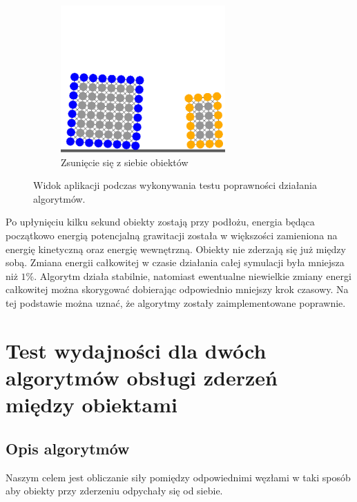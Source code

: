 \documentclass[12pt, letterpaper]{report}
\begin{document}
\begin{figure}[H]
\begin{subfigure}{0.5\textwidth}
            \includegraphics[width=6.3cm]{app_correctness_04.png}
            \caption{Zsunięcie się z siebie obiektów}
        \end{subfigure}
        
        \caption{Widok aplikacji podczas wykonywania testu poprawności działania algorytmów.}
    \end{figure}

    Po upłynięciu kilku sekund obiekty zostają przy podłożu, energia będąca początkowo energią
    potencjalną grawitacji została w większości zamieniona na energię kinetyczną oraz energię
    wewnętrzną. Obiekty nie zderzają się już między sobą.
    Zmiana energii całkowitej w czasie działania całej symulacji była mniejsza niż $1\%$. 
    Algorytm działa stabilnie, natomiast ewentualne niewielkie zmiany energi całkowitej
    można skorygować dobierając odpowiednio mniejszy krok czasowy.
    Na tej podstawie można uznać, że algorytmy zostały zaimplementowane poprawnie.

    \clearpage
    \section{Test wydajności dla dwóch algorytmów obsługi zderzeń między obiektami}
    \subsection{Opis algorytmów}
    Naszym celem jest obliczanie siły pomiędzy odpowiednimi węzłami w taki sposób aby 
    obiekty przy zderzeniu odpychały się od siebie.
    
\end{document}
